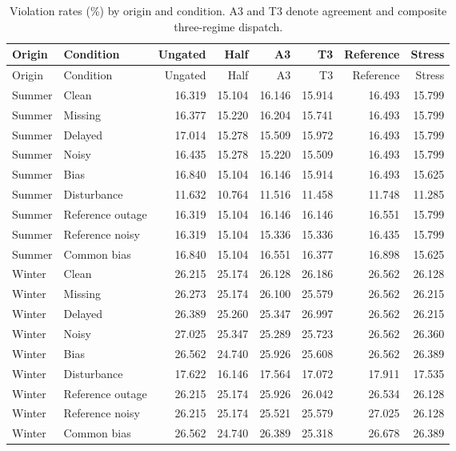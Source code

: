 \documentclass[11pt]{article}
\begin{document}
\small\begin{longtable}{llrrrrrr}
\caption{Violation rates (\%) by origin and condition. A3 and T3 denote agreement and composite three-regime dispatch.}\\\toprule
Origin & Condition & Ungated & Half & A3 & T3 & Reference & Stress\\\midrule
\endfirsthead
\toprule
Origin & Condition & Ungated & Half & A3 & T3 & Reference & Stress\\\midrule
\endhead
\bottomrule\endfoot
Summer & Clean & 16.319 & 15.104 & 16.146 & 15.914 & 16.493 & 15.799\\
Summer & Missing & 16.377 & 15.220 & 16.204 & 15.741 & 16.493 & 15.799\\
Summer & Delayed & 17.014 & 15.278 & 15.509 & 15.972 & 16.493 & 15.799\\
Summer & Noisy & 16.435 & 15.278 & 15.220 & 15.509 & 16.493 & 15.799\\
Summer & Bias & 16.840 & 15.104 & 16.146 & 15.914 & 16.493 & 15.625\\
Summer & Disturbance & 11.632 & 10.764 & 11.516 & 11.458 & 11.748 & 11.285\\
Summer & Reference outage & 16.319 & 15.104 & 16.146 & 16.146 & 16.551 & 15.799\\
Summer & Reference noisy & 16.319 & 15.104 & 15.336 & 15.336 & 16.435 & 15.799\\
Summer & Common bias & 16.840 & 15.104 & 16.551 & 16.377 & 16.898 & 15.625\\
Winter & Clean & 26.215 & 25.174 & 26.128 & 26.186 & 26.562 & 26.128\\
Winter & Missing & 26.273 & 25.174 & 26.100 & 25.579 & 26.562 & 26.215\\
Winter & Delayed & 26.389 & 25.260 & 25.347 & 26.997 & 26.562 & 26.215\\
Winter & Noisy & 27.025 & 25.347 & 25.289 & 25.723 & 26.562 & 26.360\\
Winter & Bias & 26.562 & 24.740 & 25.926 & 25.608 & 26.562 & 26.389\\
Winter & Disturbance & 17.622 & 16.146 & 17.564 & 17.072 & 17.911 & 17.535\\
Winter & Reference outage & 26.215 & 25.174 & 25.926 & 26.042 & 26.534 & 26.128\\
Winter & Reference noisy & 26.215 & 25.174 & 25.521 & 25.579 & 27.025 & 26.128\\
Winter & Common bias & 26.562 & 24.740 & 26.389 & 25.318 & 26.678 & 26.389\\
\end{longtable}\normalsize
\end{document}
